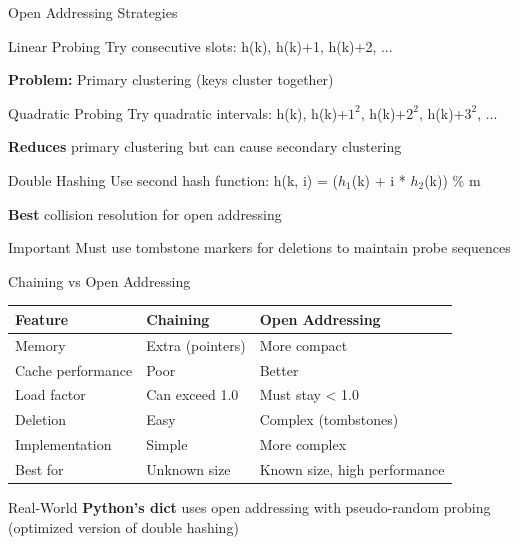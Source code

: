 \documentclass[aspectratio=169,xcolor=dvipsnames]{beamer}
\begin{document}
\begin{frame}{Open Addressing Strategies}
  \begin{block}{Linear Probing}
    Try consecutive slots: h(k), h(k)+1, h(k)+2, ...

    \textbf{Problem:} Primary clustering (keys cluster together)
  \end{block}

  \begin{block}{Quadratic Probing}
    Try quadratic intervals: h(k), h(k)+$1^2$, h(k)+$2^2$, h(k)+$3^2$, ...

    \textbf{Reduces} primary clustering but can cause secondary clustering
  \end{block}

  \begin{block}{Double Hashing}
    Use second hash function: h(k, i) = ($h_1$(k) + i * $h_2$(k)) \% m

    \textbf{Best} collision resolution for open addressing
  \end{block}

  \begin{alertblock}{Important}
    Must use tombstone markers for deletions to maintain probe sequences
  \end{alertblock}
\end{frame}

\begin{frame}{Chaining vs Open Addressing}
  \begin{table}
    \centering
    \small
    \begin{tabular}{l|p{4cm}|p{4cm}}
      \toprule
      \textbf{Feature} & \textbf{Chaining} & \textbf{Open Addressing} \\
      \midrule
      Memory & Extra (pointers) & More compact \\
      Cache performance & Poor & Better \\
      Load factor & Can exceed 1.0 & Must stay < 1.0 \\
      Deletion & Easy & Complex (tombstones) \\
      Implementation & Simple & More complex \\
      Best for & Unknown size & Known size, high performance \\
      \bottomrule
    \end{tabular}
  \end{table}

  \vspace{0.3cm}

  \begin{exampleblock}{Real-World}
    \textbf{Python's dict} uses open addressing with pseudo-random probing (optimized version of double hashing)
  \end{exampleblock}
\end{frame}
\end{document}
